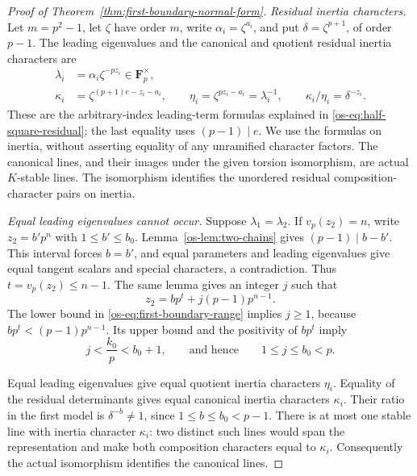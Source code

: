\begin{proof}[Proof of Theorem~\ref{thm:first-boundary-normal-form}]
\smallskip\noindent
\emph{Residual inertia characters.}
Let $m=p^2-1$, let $\zeta$ have order $m$, write
$\alpha_i=\zeta^{a_i}$, and put $\delta=\zeta^{p+1}$, of order
$p-1$. The leading eigenvalues and the canonical and quotient
residual inertia characters are
\begin{equation}\label{os-eq:first-boundary-residual}
 \begin{aligned}
 \lambda_i&=\alpha_i\zeta^{-pz_i}\in\mathbf F_p^{\times},\\
 \kappa_i&=\zeta^{(p+1)e-z_i-a_i},\qquad
 \eta_i=\zeta^{pz_i-a_i}=\lambda_i^{-1},\qquad
 \kappa_i/\eta_i=\delta^{-z_i}.
 \end{aligned}
\end{equation}
These are the arbitrary-index leading-term formulas explained in
\eqref{os-eq:half-square-residual}; the last equality uses
$(p-1)\mid e$. We use the formulas on inertia, without asserting
equality of any unramified character factors. The canonical lines,
and their images under the given torsion isomorphism, are actual
$K$-stable lines. The isomorphism identifies the unordered residual
composition-character pairs on inertia.

\smallskip\noindent
\emph{Equal leading eigenvalues cannot occur.}
Suppose $\lambda_1=\lambda_2$. If $v_p(z_2)=n$, write
$z_2=b'p^n$ with $1\le b'\le b_0$. Lemma~\ref{os-lem:two-chains}
gives $(p-1)\mid b-b'$. This interval forces $b=b'$, and equal
parameters and leading eigenvalues give equal tangent scalars and
special characters, a contradiction. Thus $t=v_p(z_2)\le n-1$.
The same lemma gives an integer $j$ such that
\begin{equation}\label{os-eq:first-boundary-partner}
 z_2=bp^t+j(p-1)p^{n-1}.
\end{equation}
The lower bound in \eqref{os-eq:first-boundary-range} implies
$j\ge1$, because $bp^t<(p-1)p^{n-1}$. Its upper bound and the
positivity of $bp^t$ imply
\[
 j<\frac{k_0}{p}<b_0+1,
 \qquad\text{and hence}\qquad 1\le j\le b_0<p.
\]

Equal leading eigenvalues give equal quotient inertia characters
$\eta_i$. Equality of the residual determinants gives equal
canonical inertia characters $\kappa_i$. Their ratio in the first
model is $\delta^{-b}\ne1$, since $1\le b\le b_0<p-1$.
There is at most one stable line with inertia character $\kappa_i$:
two distinct such lines would span the representation and make
both composition characters equal to $\kappa_i$.
Consequently the actual isomorphism identifies the canonical lines.


\end{proof}
